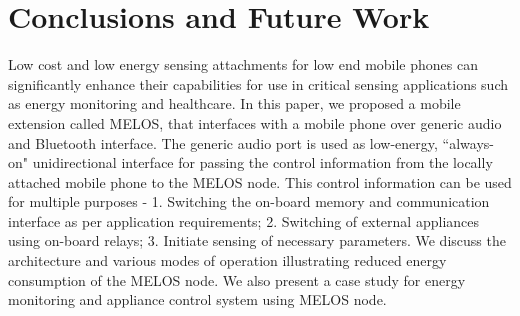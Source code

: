 \documentclass[10pt]{sigplan-proc-varsize}
\newcommand{\melos}{MELOS }
\newcommand{\melosnospace}{MELOS}
\begin{document}
%
%
%
%

\section{Conclusions and Future Work}
\label{sec:conc}
Low cost and low energy sensing attachments for low end mobile phones can significantly enhance their capabilities for use in critical sensing applications such as energy monitoring and healthcare. In this paper, we proposed a mobile extension called \melosnospace, that interfaces with a mobile phone over generic audio and Bluetooth interface. The generic audio port is used as low-energy, ``always-on" unidirectional interface for passing the control information from the locally attached mobile phone to the \melos node. This control information can be used for multiple purposes - 1. Switching the on-board memory and communication interface as per application requirements; 2. Switching of external appliances using on-board relays; 3. Initiate sensing of necessary parameters.
We discuss the architecture and various modes of operation illustrating reduced energy consumption of the \melos node. We also present a case study for energy monitoring and appliance control system using \melos node. 
\end{document}
